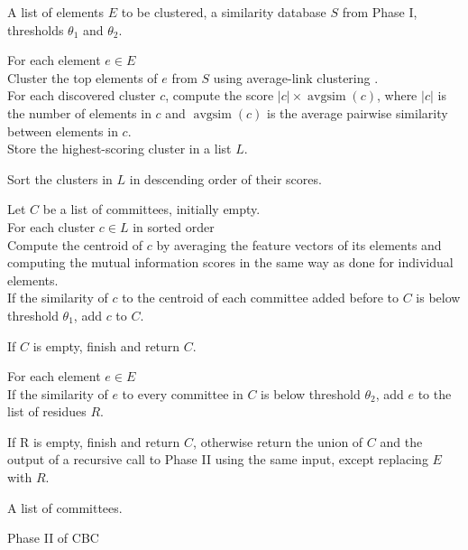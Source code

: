 \begin{algorithm}
\begin{description}[align=left, labelwidth=4em]
\item[Input:] A list of elements $E$ to be clustered, a similarity database $S$
from Phase I, thresholds $\theta_1$ and $\theta_2$. \\

\item[Step 1:] For each element $e \in E$ \\

Cluster the top elements of $e$ from $S$ using average-link clustering
\citep{han2000data}. \\

For each discovered cluster $c$, compute the score
$|c| \times \operatorname{avgsim}(c)$, where $|c|$ is the number of elements in
$c$ and $\operatorname{avgsim}(c)$ is the average pairwise similarity between
elements in $c$. \\

Store the highest-scoring cluster in a list $L$. \\

\item[Step 2:] Sort the clusters in $L$ in descending order of their scores. \\

\item[Step 3:] Let $C$ be a list of committees, initially empty. \\

For each cluster $c \in L$ in sorted order \\

Compute the centroid of $c$ by averaging the feature vectors of its elements and
computing the mutual information scores in the same way as done for individual
elements. \\

If the similarity of $c$ to the centroid of each committee added before to $C$
is below threshold $\theta_1$, add $c$ to $C$. \\

\item[Step 4:] If $C$ is empty, finish and return $C$. \\

\item[Step 5:] For each element $e \in E$ \\

If the similarity of $e$ to every committee in $C$ is below threshold
$\theta_2$, add $e$ to the list of residues $R$. \\

\item[Step 6:] If R is empty, finish and return $C$, otherwise return the union
of $C$ and the output of a recursive call to Phase II using the same input,
except replacing $E$ with $R$. \\

\item[Output:] A list of committees.
\end{description}
\caption[Phase II of CBC]{\label{alg:cbcphaseii} Phase II of CBC  \citep{pantel2003clustering}}
\end{algorithm}


